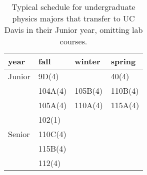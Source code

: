 \documentclass[12pt]{article}
\begin{document}
\begin{table}
\caption{Typical schedule for undergraduate physics majors that transfer to UC Davis in their Junior year, omitting lab courses.}
\label{tbl:current-transfers}
\begin{center}
\begin{tabular}{|l|l|l|l|}
\hline
year      & fall    & winter & spring  \\
\hline
Junior    & 9D(4)   &         & 40(4)   \\
          & 104A(4) & 105B(4) & 110B(4) \\
          & 105A(4) & 110A(4) & 115A(4) \\
          & 102(1)  &       & \\
\hline
Senior    & 110C(4) &        & \\
          & 115B(4) &        & \\
          & 112(4)  &        & \\
\hline 
\end{tabular}
\end{center}
\end{table}
\end{document}
